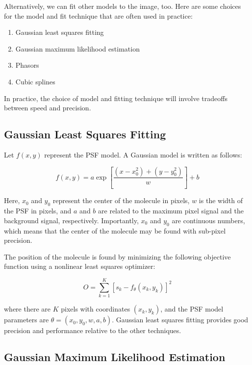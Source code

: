 \documentclass[10pt,a4paper,oneside]{book}
\begin{document}
Alternatively, we can fit other models to the image, too. Here are some choices for the model and fit technique that are often used in practice:

\begin{enumerate}
    \item Gaussian least squares fitting
    \item Gaussian maximum likelihood estimation
    \item Phasors
    \item Cubic splines
\end{enumerate}

In practice, the choice of model and fitting technique will involve tradeoffs between speed and precision.

\subsection{Gaussian Least Squares Fitting}

Let $f \left(x, y\right)$ represent the PSF model. A Gaussian model is written as follows:

\begin{equation}
    f \left(x, y\right) = a \exp \left[ \frac{\left(x-x_{0}^2\right) + \left(y - y_{0}^2\right)}{w} \right] + b
\end{equation}

\noindent Here, $x_0$ and $y_0$ represent the center of the molecule in pixels, $w$ is the width of the PSF in pixels, and $a$ and $b$ are related to the maximum pixel signal and the background signal, respectively. Importantly, $x_0$ and $y_0$ are continuous numbers, which means that the center of the molecule may be found with sub-pixel precision.

The position of the molecule is found by minimizing the following objective function using a nonlinear least squares optimizer:

\begin{equation}
    O = \sum_{k=1}^K \left[ s_k - f_{\theta} \left(x_k, y_k\right)\right]^2
\end{equation}

\noindent where there are $K$ pixels with coordinates $\left( x_k, y_k\right)$, and the PSF model parameters are $\theta = \left( x_0, y_0, w, a, b \right)$. Gaussian least squares fitting provides good precision and performance relative to the other techniques.

\subsection{Gaussian Maximum Likelihood Estimation}
\end{document}
